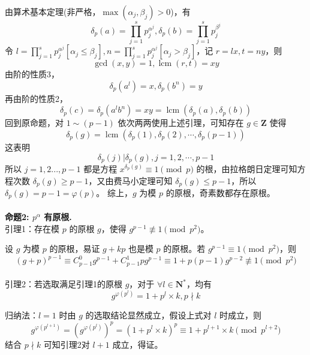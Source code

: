 \documentclass[12pt,a4paper]{article}
\begin{document}
由算术基本定理(非严格，$\max(\alpha_j,\beta_j)>0$)，有 
\begin{equation*}
	\displaystyle \delta_p(a)=\prod_{j=1}^{s}p_j^{\alpha^{j}},\delta_p(b)=\prod_{j=1}^{s}p_j^{\beta^{j}}
\end{equation*}
令 $\displaystyle l=\prod_{j=1}^{s}p_j^{\alpha^{j}}[\alpha_j\le\beta_j],n=\prod_{j=1}^{s}p_j^{\alpha^{j}}[\alpha_j>\beta_j]$，记 $r=lx,t=ny$，则 \begin{equation*}
	\gcd(x,y)=1,\operatorname{lcm}(r,t)=xy
\end{equation*}
由阶的性质3，\begin{equation*}
	\displaystyle\delta_p(a^l)=x,\delta_p(b^n)=y
\end{equation*}
再由阶的性质2，
\begin{equation*}
	\displaystyle\delta_p(c)=\delta_p(a^lb^n)=xy=\operatorname{lcm}(\delta_p(a),\delta_p(b))
\end{equation*}
回到原命题，对 $1\sim(p-1)$ 依次两两使用上述引理，可知存在 $g\in\mathbf{Z}$ 使得 
\begin{equation*}
	\delta_p(g)=\operatorname{lcm}\left(\delta_p(1),\delta_p(2),\cdots,\delta_p(p-1)\right)
\end{equation*}
这表明 
\begin{equation*}\delta_p(j)|\delta_p(g),j=1,2,\cdots,p-1\end{equation*}
所以 $j=1,2...,p-1$ 都是方程 $x^{\delta_p(g)}\equiv1\pmod p$ 的根，由拉格朗日定理可知方程次数 $\delta_p(g)\ge p-1$，又由费马小定理可知 $\delta_p(g)\le p-1$，所以 $\delta_p(g)=p-1=\varphi(p)$。
综上，$g$ 为模 $p$ 的原根，奇素数都存在原根。
\\
\\
\textbf{命题2: $p^{\alpha}$ 有原根.}
\\引理1：存在模 $p$ 的原根 $g$，使得 $g^{p-1}\not\equiv1\pmod{p^2}$。

设 $g$ 为模 $p$ 的原根，易证 $g+kp$ 也是模 $p$ 的原根。若 $g^{p-1}\equiv1\pmod{p^2}$，则 
\begin{equation*}
	(g+p)^{p-1}\equiv C^0_{p-1}g^{p-1}+C^1_{p-1}pg^{p-1}\equiv1+p(p-1)g^{p-2}\not\equiv1\pmod{p^2}
\end{equation*}
\\引理2：若选取满足引理1的原根 $g$，对于 $\forall l\in\mathbf{N^*}$，均有 
\begin{equation*}
	g^{\varphi(p^l)}=1+p^l\times k,p\nmid k
\end{equation*}

归纳法：$l=1$ 时由 $g$ 的选取结论显然成立，假设上式对 $l$ 时成立，则 
\begin{equation*}
	g^{\varphi(p^{l+1})}=(g^{\varphi(p^l)})^p=(1+p^l\times k)^p\equiv1+p^{l+1}\times k\pmod{p^{l+2}}
\end{equation*}
结合 $p\nmid k$ 可知引理2对 $l+1$ 成立，得证。
\end{document}

